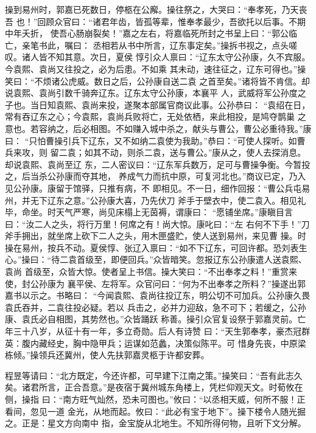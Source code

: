 操到易州时，郭嘉已死数日，停柩在公廨。操往祭之，大哭曰：“奉孝死，乃天丧吾
也！”回顾众官曰：“诸君年齿，皆孤等辈，惟奉孝最少，吾欲托以后事。不期中年夭折，
使吾心肠崩裂矣！”嘉之左右，将嘉临死所封之书呈上曰：“郭公临亡，亲笔书此，嘱曰：
丞相若从书中所言，辽东事定矣。”操拆书视之，点头嗟叹。诸人皆不知其意。次日，夏侯
惇引众人禀曰：“辽东太守公孙康，久不宾服。今袁熙、袁尚又往投之，必为后患。不如乘
其未动，速往征之，辽东可得也。”操笑曰：“不烦诸公虎威。数日之后，公孙康自送二袁
之首至矣。”诸将皆不肯信。却说袁熙、袁尚引数千骑奔辽东。辽东太守公孙康，本襄平
人，武威将军公孙度之子也。当日知袁熙、袁尚来投，遂聚本部属官商议此事。公孙恭曰：
“袁绍在日，常有吞辽东之心；今袁熙，袁尚兵败将亡，无处依栖，来此相投，是鸠夺鹊巢
之意也。若容纳之，后必相图。不如赚入城中杀之，献头与曹公，曹公必重待我。”康曰：
“只怕曹操引兵下辽东，又不如纳二袁使为我助。”恭曰：“可使人探听。如曹兵来攻，则
留二袁；如其不动，则杀二袁，送与曹公。”康从之，使人去探消息。却说袁熙、袁尚至辽
东，二人密议曰：“辽东军兵数万，足可与曹操争衡。今暂投之，后当杀公孙康而夺其地，
养成气力而抗中原，可复河北也。”商议已定，乃入见公孙康。康留于馆驿，只推有病，不
即相见。不一日，细作回报：“曹公兵屯易州，并无下辽东之意。”公孙康大喜，乃先伏刀
斧手于壁衣中，使二袁入。相见礼毕，命坐。时天气严寒，尚见床榻上无茵褥，谓康曰：
“愿铺坐席。”康瞋目言曰：“汝二人之头，将行万里！何席之有！尚大惊。康叱曰：“左
右何不下手！”刀斧手拥出，就坐席上砍下二人之头，用木匣盛贮，使人送到易州，来见曹
操。时操在易州，按兵不动。夏侯惇、张辽入禀曰：“如不下辽东，可回许都。恐刘表生
心。”操曰：“待二袁首级至，即便回兵。”众皆暗笑。忽报辽东公孙康遣人送袁熙、袁尚
首级至，众皆大惊。使者呈上书信。操大笑曰：“不出奉孝之料！”重赏来使，封公孙康为
襄平侯、左将军。众官问曰：“何为不出奉孝之所料？”操遂出郭嘉书以示之。书略曰：
“今闻袁熙、袁尚往投辽东，明公切不可加兵。公孙康久畏袁氏吞并，二袁往投必疑。若以
兵击之，必并力迎敌，急不可下；若缓之，公孙康、袁氏必自相图，其势然也。”众皆踊跃
称善。操引众官复设祭于郭嘉灵前。亡年三十八岁，从征十有一年，多立奇勋。后人有诗赞
曰：“天生郭奉孝，豪杰冠群英：腹内藏经史，胸中隐甲兵；运谋如范蠡，决策似陈平。可
惜身先丧，中原梁栋倾。”操领兵还冀州，使人先扶郭嘉灵柩于许都安葬。

程昱等请曰：“北方既定，今还许都，可早建下江南之策。”操笑曰：“吾有此志久
矣。诸君所言，正合吾意。”是夜宿于冀州城东角楼上，凭栏仰观天文。时荀攸在侧，操指
曰：“南方旺气灿然，恐未可图也。”攸曰：“以丞相天威，何所不服！正看间，忽见一道
金光，从地而起。攸曰：“此必有宝于地下”。操下楼令人随光掘之。正是：星文方向南中
指，金宝旋从北地生。不知所得何物，且听下文分解。